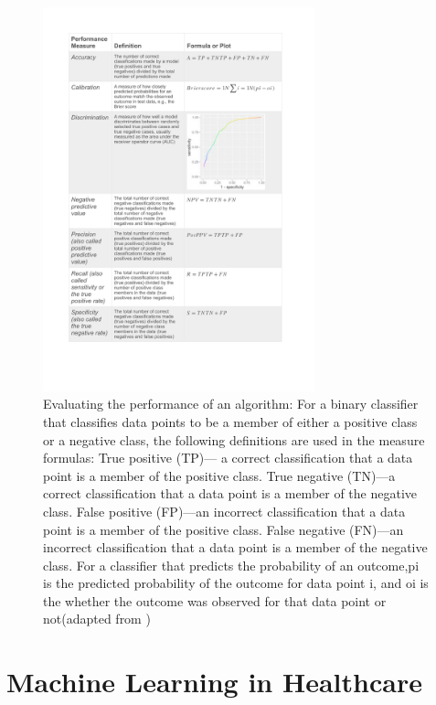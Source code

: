 \begin{figure}[h]
\caption{Evaluating the performance of an algorithm: For a binary classifier that classifies data points to be a member of either a positive class or a negative class, the following definitions are used in the measure formulas: True positive (TP)— a correct classification that a data point is a member of the positive class. True negative (TN)—a correct classification that a data point is a member of the negative class. False positive (FP)—an incorrect classification that a data point is a member of the positive class. False negative (FN)—an incorrect classification that a data point is a member of the negative class. For a classifier that predicts the probability of an outcome,pi is the predicted probability of the outcome for data point i, and oi is the whether the outcome was observed for that data point or not(adapted from \citep{Callahan:2017bz})}
\centering
\includegraphics[width=0.7\textwidth]{ThesisTemplate/usingLatex/images/AlgPerformance.png}
\end{figure}

\section{Machine Learning in Healthcare}
